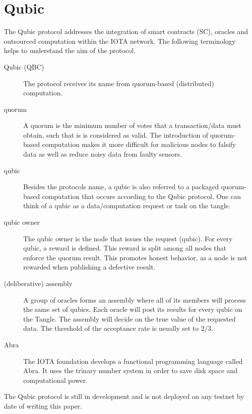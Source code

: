 \section{Qubic}\label{qubic}
The Qubic protocol addresses the integration of smart contracts (SC), oracles and outsourced computation within the IOTA network. The following terminology helps to understand the aim of the protocol.
\begin{description}
    \item[Qubic (QBC)] The protocol receives its name from quorum-based (distributed) computation.
    \item[quorum] A quorum is the minimum number of votes that a transaction/data must obtain, such that is is considered as valid. The introduction of quorum-based computation makes it more difficult for malicious nodes to falsify data as well as reduce noisy data from faulty sensors. 
    \item[qubic] Besides the protocols name, a qubic is also referred to a packaged quorum-based computation that occurs according to the Qubic protocol. One can think of a qubic as a data/computation request or task on the tangle. 
    \item[qubic owner] The qubic owner is the node that issues the request (qubic). For every qubic, a reward is defined. This reward is split among all nodes that enforce the quorum result. This promotes honest behavior, as a node is not rewarded when publishing a defective result.
    \item[(deliberative) assembly] A group of oracles forms an assembly where all of its members will process the same set of qubics. Each oracle will post its results for every qubic on the Tangle. The assembly will decide on the true value of the requested data. The threshold of the acceptance rate is usually set to $2/3$.
    \item[Abra] The IOTA foundation develops a functional programming language called Abra. It uses the trinary number system in order to save disk space and computational power.
\end{description}

The Qubic protocol is still in development and is not deployed on any testnet by date of writing this paper.

